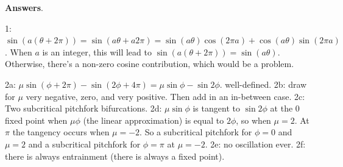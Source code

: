 \documentclass[12pt,letterpaper,noanswers]{exam}
\begin{document}
\vfill

\eject
\textbf{Answers}.

1: $\sin(a(\theta + 2\pi)) = \sin(a\theta + a2\pi) = \sin(a\theta)\cos(2\pi a)+\cos(a\theta)\sin(2\pi a)$.  When $a$ is an integer, this will lead to $\sin(a(\theta + 2\pi)) = \sin(a\theta)$.  Otherwise, there's a non-zero cosine contribution, which would be a problem.

2a: $\mu\sin(\phi+2\pi) -\sin(2\phi+ 4\pi) = \mu\sin\phi-\sin 2\phi$.  well-defined.  2b: draw for $\mu$ very negative, zero, and very positive.  Then add in an in-between case.  2c: Two subcritical pitchfork bifurcations.  2d: $\mu\sin\phi$ is tangent to $\sin 2\phi$ at the $0$ fixed point when $\mu\phi$ (the linear approximation) is equal to $2\phi$, so when $\mu = 2$.  At $\pi$ the tangency occurs when $\mu = -2$.  So a subcritical pitchfork for $\phi = 0$ and $\mu = 2$ and a subcritical pitchfork for $\phi = \pi$ at $\mu = -2$.  2e: no oscillation ever.  2f: there is always entrainment (there is always a fixed point).
\end{document}
